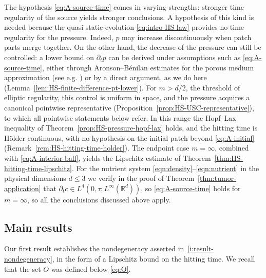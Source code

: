 \documentclass[11pt]{amsart}
\numberwithin{equation}{section}
\numberwithin{figure}{section}
\theoremstyle{plain}
\theoremstyle{definition}
\theoremstyle{remark}
\theoremstyle{plain}
\def\R{\mathbb{R}}
\begin{document}
The hypothesis \eqref{eq:A-source-time} comes in varying strengths: stronger time
regularity of the source yields stronger conclusions. A hypothesis of this kind is needed
because the quasi-static evolution \eqref{eq:intro-HS-law} provides no time regularity for
the pressure. Indeed, $p$ may increase discontinuously when patch parts merge together. On the other hand, the decrease of the pressure can still be controlled: a lower bound on $\partial_t p$ can be derived under assumptions such as \eqref{eq:A-source-time}, either through Aronson--B\'enilan estimates for the porous medium approximation (see e.g. \cite{PQV14}) or by a direct argument, as we do here (Lemma~\ref{lem:HS-finite-difference-pt-lower}). For $m>d/2$, the threshold of elliptic regularity, this control is uniform
in space, and the pressure acquires a canonical pointwise representative
(Proposition~\ref{prop:HS-USC-representative}), to which all pointwise statements below
refer. In this range the Hopf--Lax inequality of Theorem~\ref{prop:HS-pressure-hopf-lax}
holds, and the hitting time is H\"older continuous, with no hypothesis on the initial patch
beyond \eqref{eq:A-initial} (Remark~\ref{rem:HS-hitting-time-holder}). The endpoint case
$m=\infty$, combined with \eqref{eq:A-interior-ball}, yields the Lipschitz estimate of
Theorem~\ref{thm:HS-hitting-time-lipschitz}. For the
nutrient system \eqref{eqn:density}--\eqref{eqn:nutrient} in the physical dimensions
$d\leq3$ we verify
in the proof of Theorem~\ref{thm:tumor-application} that $\partial_t c\in L^4(0,\tau;L^\infty(\R^d))$, so  \eqref{eq:A-source-time} holds for $m=\infty$, so all the conclusions discussed above apply.

\subsection{Main results}\label{subsec:intro-results}

Our first result establishes the nondegeneracy asserted in~\ref{i:result-nondegeneracy}, in the form of a Lipschitz
bound on the hitting time. We recall that the set $O$ was defined below \eqref{eq:O}.
\end{document}
